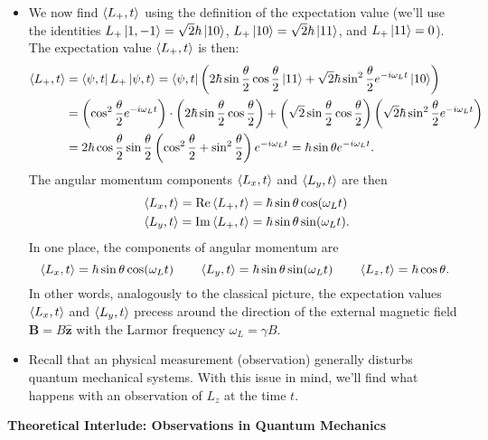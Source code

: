 \documentclass[11pt, a4paper]{article}
\renewcommand{\vec}[1]{\bm{#1}} %
\newcommand{\uvec}[1]{\hat{\vec{#1}}} %
\begin{document}
\begin{itemize}
	\item We now find $ \ev{L_{+}, t} $ using the definition of the expectation value (we'll use the identities $ L_{+}\ket{1, -1} = \sqrt{2}\hbar \ket{10} $, $ L_{+}\ket{10} = \sqrt{2}\hbar \ket{11} $, and $ L_{+}\ket{11} = 0 $). The expectation value $ \ev{L_{+}, t} $ is then:
	\begin{align*}
		\ev{L_{+}, t} &= \bra{\psi, t} L_{+}\ket{\psi, t} = \bra{\psi, t} \left(2 \hbar \sin \frac{\theta}{2} \cos \frac{\theta}{2}\ket{11} + \sqrt{2}\hbar \sin^{2}\frac{\theta}{2}e^{-i\omega_{L}t}\ket{10}\right)\\
		&=\left(\cos^{2}\frac{\theta}{2} e^{-i\omega_{L}t}\right)\cdot \left(2\hbar \sin\frac{\theta}{2}\cos\frac{\theta}{2}\right) + \left(\sqrt{2}\sin \frac{\theta}{2}\cos \frac{\theta}{2}\right)\left(\sqrt{2}\hbar\sin^{2}\frac{\theta}{2}e^{-i\omega_{L}t}\right)\\
		&=2\hbar\cos\frac{\theta}{2}\sin\frac{\theta}{2}\left(\cos^{2}\frac{\theta}{2} + \sin^{2}\frac{\theta}{2}\right)e^{-i\omega_{L}t}= \hbar \sin\theta e^{-i\omega_{L}t}.
	\end{align*}
	The angular momentum components $ \ev{L_{x}, t} $ and $ \ev{L_{y}, t} $ are then
	\begin{align*}
		&\ev{L_{x}, t} = \Re \ev{L_{+}, t} = \hbar \sin \theta \cos( \omega_{L}t)\\
		& \ev{L_{y}, t} = \Im \ev{L_{+}, t} = \hbar \sin \theta \sin( \omega_{L}t).
	\end{align*}
	In one place, the components of angular momentum are
	\begin{equation*}
		\ev{L_{x}, t} = \hbar \sin \theta \cos( \omega_{L}t) \qquad 	\ev{L_{y}, t} = \hbar \sin \theta \sin( \omega_{L}t) \qquad 
		\ev{L_{z}, t} = \hbar \cos \theta.
	\end{equation*}
	In other words, analogously to the classical picture, the expectation values $ \ev{L_{x}, t} $ and $ \ev{L_{y}, t} $ precess around the direction of the external magnetic field $ \vec{B} = B \uvec{z} $ with the Larmor frequency $ \omega_{L} = \gamma B $. 
	
	\item Recall that an physical measurement (observation) generally disturbs quantum mechanical systems. With this issue in mind, we'll find what happens with an observation of $ L_{z} $  at the time $ t $. 
	
\end{itemize}
\textbf{Theoretical Interlude: Observations in Quantum Mechanics}
\end{document}
